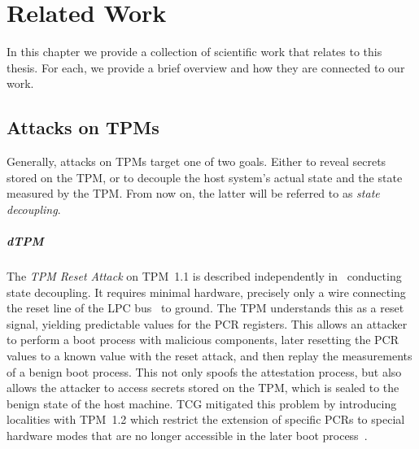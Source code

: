 
\chapter{Related Work}\label{chapter:related_work}

In this chapter we provide a collection of scientific work that relates to this thesis.
For each, we provide a brief overview and how they are connected to our work.

\section{Attacks on TPMs}

Generally, attacks on \acp{TPM} target one of two goals.
Either to reveal secrets stored on the TPM, or to decouple the host system's actual state and the state measured by the \ac{TPM}\@.
From now on, the latter will be referred to as \emph{state decoupling}.




\paragraph{\Acl{dTPM}}

The \emph{TPM Reset Attack} on TPM~1.1 is described independently in~\cite{kauerBernhard,sparks2007} conducting state decoupling.
It requires minimal hardware, precisely only a wire connecting the reset line of the LPC bus~\cite{lpc} to ground.
The TPM understands this as a reset signal, yielding predictable values for the \ac{PCR} registers.
This allows an attacker to perform a boot process with malicious components, later resetting the \ac{PCR} values to a known value with the reset attack, and then replay the measurements of a benign boot process.
This not only spoofs the attestation process, but also allows the attacker to access secrets stored on the TPM, which is sealed to the benign state of the host machine.
\Ac{TCG} mitigated this problem by introducing localities with TPM~1.2 which restrict the extension of specific \acp{PCR} to special hardware modes that are no longer accessible in the later boot process~\cite{Proskurin2016}.


